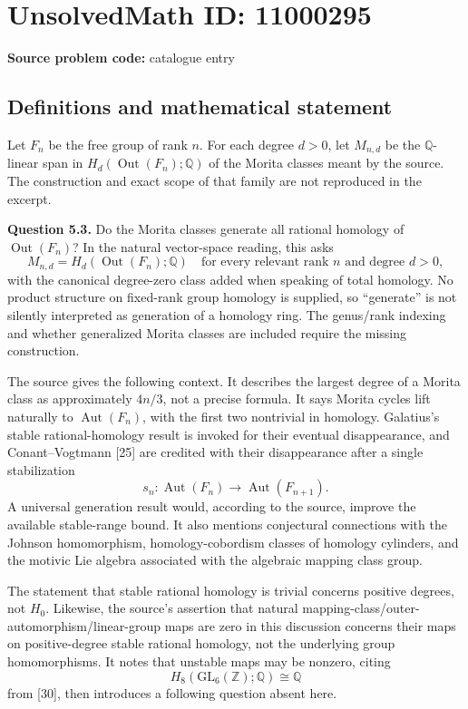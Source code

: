 \documentclass[11pt]{article}
\newcommand{\Z}{\mathbb{Z}}
\newcommand{\Q}{\mathbb{Q}}
\begin{document}
\section*{UnsolvedMath ID: 11000295}
\textbf{Source problem code:} catalogue entry
\subsection{Definitions and mathematical statement}
Let $F_n$ be the free group of rank $n$. For each degree $d>0$, let $M_{n,d}$ be the $\Q$-linear span in $H_d(\operatorname{Out}(F_n);\Q)$ of the Morita classes meant by the source. The construction and exact scope of that family are not reproduced in the excerpt.

\textbf{Question 5.3.} Do the Morita classes generate all rational homology of $\operatorname{Out}(F_n)$? In the natural vector-space reading, this asks
\[
 M_{n,d}=H_d(\operatorname{Out}(F_n);\Q)
 \quad\text{for every relevant rank }n\text{ and degree }d>0,
\]
with the canonical degree-zero class added when speaking of total homology. No product structure on fixed-rank group homology is supplied, so ``generate'' is not silently interpreted as generation of a homology ring. The genus/rank indexing and whether generalized Morita classes are included require the missing construction.

The source gives the following context. It describes the largest degree of a Morita class as approximately $4n/3$, not a precise formula. It says Morita cycles lift naturally to $\operatorname{Aut}(F_n)$, with the first two nontrivial in homology. Galatius's stable rational-homology result is invoked for their eventual disappearance, and Conant--Vogtmann [25] are credited with their disappearance after a single stabilization
\[
 s_n:\operatorname{Aut}(F_n)\to\operatorname{Aut}(F_{n+1}).
\]
A universal generation result would, according to the source, improve the available stable-range bound. It also mentions conjectural connections with the Johnson homomorphism, homology-cobordism classes of homology cylinders, and the motivic Lie algebra associated with the algebraic mapping class group.

The statement that stable rational homology is trivial concerns positive degrees, not $H_0$. Likewise, the source's assertion that natural mapping-class/outer-automorphism/linear-group maps are zero in this discussion concerns their maps on positive-degree stable rational homology, not the underlying group homomorphisms. It notes that unstable maps may be nonzero, citing
\[
 H_8(\mathrm{GL}_6(\Z);\Q)\cong\Q
\]
from [30], then introduces a following question absent here.
\end{document}
